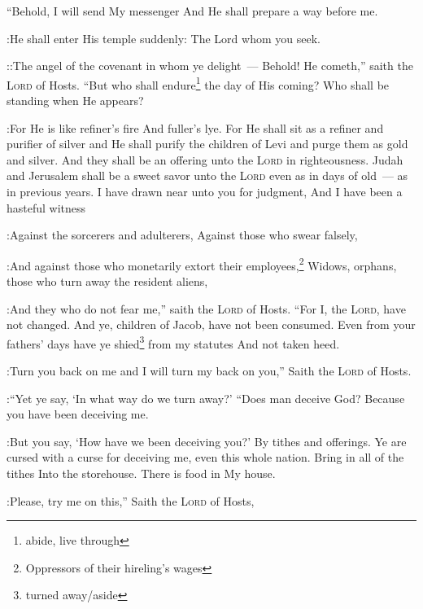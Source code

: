 

\begin{enumerate*}[mode=unboxed]
     ``Behold, I will send My messenger And He shall prepare a way before me.%

:He shall enter His temple suddenly: The Lord whom you seek.%

::The angel of the covenant in whom ye delight~--- Behold! He cometh,'' saith the \textsc{Lord} of Hosts.%
     ``But who shall endure\footnote{abide, live through} the day of His coming? Who shall be standing when He appears?%

:For He is like refiner's fire And fuller's lye.%
     For He shall sit as a refiner and purifier of silver and He shall purify the children of Levi and purge them as gold and silver. And they shall be an offering unto the \textsc{Lord} in righteousness.%
     Judah and Jerusalem shall be a sweet savor unto the \textsc{Lord} even as in days of old~--- as in previous years.%
     I have drawn near unto you for judgment, And I have been a hasteful witness%

:Against the sorcerers and adulterers, Against those who swear falsely,%

:And against those who monetarily extort their employees,\footnote{Oppressors of their hireling's wages} Widows, orphans, those who turn away the resident aliens,%

:And they who do not fear me,'' saith the \textsc{Lord} of Hosts.%
     ``For I, the \textsc{Lord}, have not changed. And ye, children of Jacob, have not been consumed.%
     Even from your fathers' days have ye shied\footnote{turned away/aside} from my statutes And not taken heed.%

:Turn you back on me and I will turn my back on you,'' Saith the \textsc{Lord} of Hosts.%

:``Yet ye say, `In what way do we turn away?'%
     ``Does man deceive God? Because you have been deceiving me.%

:But you say, `How have we been deceiving you?' By tithes and offerings.%
     Ye are cursed with a curse for deceiving me, even this whole nation.%
     Bring in all of the tithes Into the storehouse. There is food in My house.%

:Please, try me on this,'' Saith the \textsc{Lord} of Hosts,%


\end{enumerate*}
